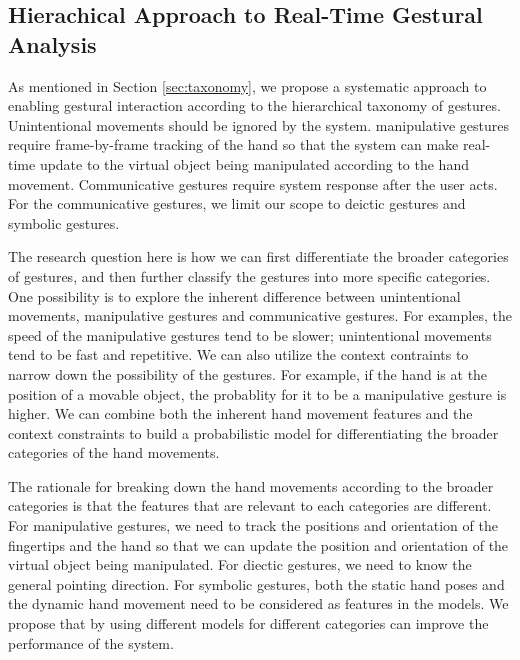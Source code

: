 \subsection{Hierachical Approach to Real-Time Gestural Analysis}
As mentioned in Section \ref{sec:taxonomy}, we propose a systematic approach to
enabling gestural interaction according to the hierarchical taxonomy of
gestures. Unintentional movements should be ignored by the system.
manipulative gestures require frame-by-frame tracking of the hand so that the
system can make real-time update to the virtual object being manipulated according to the hand
movement. Communicative gestures require system response after the user acts.
For the communicative gestures, we limit our scope to deictic gestures and symbolic gestures. 

The research question here is how we can first differentiate the broader
categories of gestures, and then further classify the gestures into more 
specific categories. One possibility is to explore the inherent difference
between unintentional movements, manipulative gestures and communicative
gestures. For examples, the speed of the manipulative gestures tend to be
slower; unintentional movements tend to be fast and repetitive. We can also
utilize the context contraints to narrow down the possibility of the gestures.
For example, if the hand is at the position of a movable object, the probablity
for it to be a manipulative gesture is higher. We can combine both the inherent
hand movement features and the context constraints to build a probabilistic
model for differentiating the broader categories of the hand movements.

The rationale for breaking down the hand movements according to the broader
categories is that the features that are relevant to each categories are
different. For manipulative gestures, we need to track the positions and 
orientation of the fingertips and the hand so that we can update the position 
and orientation of the virtual object being manipulated. For diectic gestures, 
we need to know the general pointing direction. For symbolic gestures, both the 
static hand poses and the dynamic hand movement need to be considered as 
features in the models. We propose that by using different models for
different categories can improve the performance of the system. 

